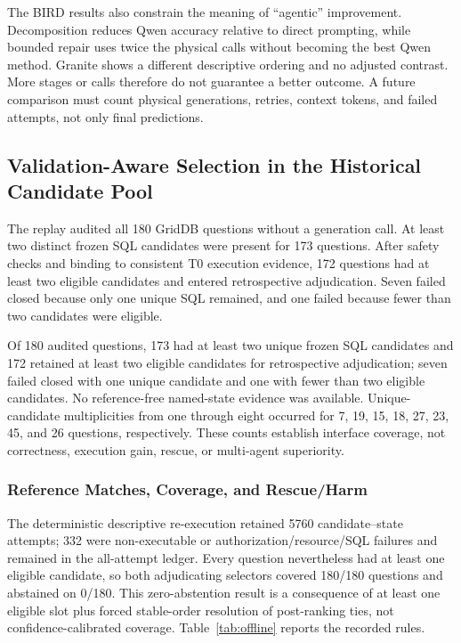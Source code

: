 \documentclass[applsci,article,submit,moreauthors]{Definitions/mdpi}
\begin{document}
The BIRD results also constrain the meaning of ``agentic'' improvement. Decomposition reduces Qwen accuracy relative to direct prompting, while bounded repair uses twice the physical calls without becoming the best Qwen method. Granite shows a different descriptive ordering and no adjusted contrast. More stages or calls therefore do not guarantee a better outcome. A future comparison must count physical generations, retries, context tokens, and failed attempts, not only final predictions.

\subsection{Validation-Aware Selection in the Historical Candidate Pool}

The replay audited all 180 GridDB questions without a generation call. At least two distinct frozen SQL candidates were present for 173 questions. After safety checks and binding to consistent T0 execution evidence, 172 questions had at least two eligible candidates and entered retrospective adjudication. Seven failed closed because only one unique SQL remained, and one failed because fewer than two candidates were eligible.

Of 180 audited questions, 173 had at least two unique frozen SQL candidates and 172 retained at least two eligible candidates for retrospective adjudication; seven failed closed with one unique candidate and one with fewer than two eligible candidates. No reference-free named-state evidence was available. Unique-candidate multiplicities from one through eight occurred for 7, 19, 15, 18, 27, 23, 45, and 26 questions, respectively. These counts establish interface coverage, not correctness, execution gain, rescue, or multi-agent superiority.

\subsubsection{Reference Matches, Coverage, and Rescue/Harm}

The deterministic descriptive re-execution retained 5760 candidate--state attempts; 332 were non-executable or authorization/resource/SQL failures and remained in the all-attempt ledger. Every question nevertheless had at least one eligible candidate, so both adjudicating selectors covered 180/180 questions and abstained on 0/180. This zero-abstention result is a consequence of at least one eligible slot plus forced stable-order resolution of post-ranking ties, not confidence-calibrated coverage. Table~\ref{tab:offline} reports the recorded rules.
\end{document}
